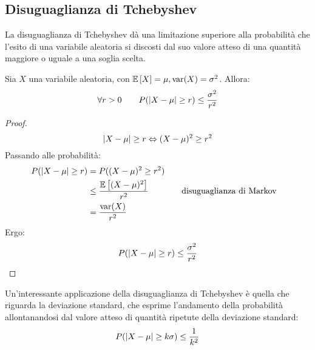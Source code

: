 \subsection{Disuguaglianza di Tchebyshev}
La disuguaglianza di Tchebyshev dà una limitazione superiore alla probabilità che l'esito di una variabile aleatoria si discosti dal suo valore atteso di una quantità maggiore o uguale a una soglia scelta.
\begin{teor}
	Sia $X$ una variabile aleatoria, con $\mathbb{E}\left[ X \right]=\mu, \operatorname{var}(X)=\sigma^2$. Allora:
	\begin{equation*}
		\forall r>0\qquad P(\left\lvert X-\mu \right\rvert\geq r)\leq \frac{\sigma^2}{r^2}
	\end{equation*}
\end{teor}
\begin{proof}
	\begin{equation*}
		\left\lvert X-\mu \right\rvert\geq r \Leftrightarrow (X-\mu)^2 \geq r^2
	\end{equation*}
	Passando alle probabilità:
	\begin{align*}
		P(\left\lvert X-\mu \right\rvert\geq r) & = P((X-\mu)^2 \geq r^2)                                       \\
		                     & \leq \frac{\mathbb{E}\left[ (X-\mu)^2 \right]}{r^2} & \quad & \text{disuguaglianza di Markov} \\
		                     & =\frac{\operatorname{var}(X)}{r^2}
	\end{align*}
	Ergo:
	\begin{equation*}
		P(\left\lvert X-\mu \right\rvert\geq r)\leq \frac{\sigma^2}{r^2}
	\end{equation*}
\end{proof}

Un'interessante applicazione della disuguaglianza di Tchebyshev è quella che riguarda la deviazione standard, che esprime l'andamento della probabilità allontanandosi dal valore atteso di quantità ripetute della deviazione standard:
\begin{equation*}
	P(\left\lvert X-\mu \right\rvert\geq k\sigma)\leq\frac{1}{k^2}
\end{equation*}
